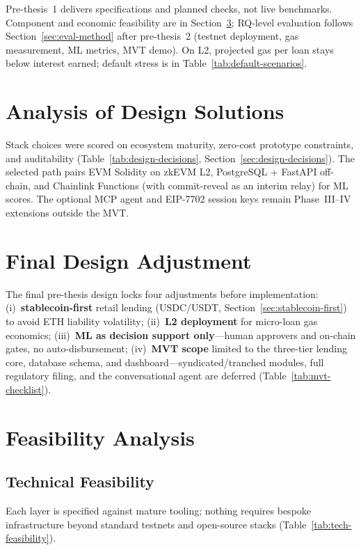 \documentclass[12pt, a4paper]{report}
\begin{document}
Pre-thesis~1 delivers specifications and planned checks, not live benchmarks. Component and economic feasibility are in Section~\ref{sec:feasibility}; RQ-level evaluation follows Section~\ref{sec:eval-method} after pre-thesis~2 (testnet deployment, gas measurement, ML metrics, MVT demo). On L2, projected gas per loan stays below interest earned; default stress is in Table~\ref{tab:default-scenarios}.

\section{Analysis of Design Solutions}
\label{sec:design-solutions-ch5}

Stack choices were scored on ecosystem maturity, zero-cost prototype constraints, and auditability (Table~\ref{tab:design-decisions}, Section~\ref{sec:design-decisions}). The selected path pairs EVM Solidity on zkEVM L2, PostgreSQL + FastAPI off-chain, and Chainlink Functions (with commit-reveal as an interim relay) for ML scores. The optional MCP agent and EIP-7702 session keys remain Phase~III--IV extensions outside the MVT.

\section{Final Design Adjustment}
\label{sec:final-design-adjustment}

The final pre-thesis design locks four adjustments before implementation: (i)~\textbf{stablecoin-first} retail lending (USDC/USDT, Section~\ref{sec:stablecoin-first}) to avoid ETH liability volatility; (ii)~\textbf{L2 deployment} for micro-loan gas economics; (iii)~\textbf{ML as decision support only}---human approvers and on-chain gates, no auto-disbursement; (iv)~\textbf{MVT scope} limited to the three-tier lending core, database schema, and dashboard---syndicated/tranched modules, full regulatory filing, and the conversational agent are deferred (Table~\ref{tab:mvt-checklist}).

\section{Feasibility Analysis}
\label{sec:feasibility}

\subsection{Technical Feasibility}

Each layer is specified against mature tooling; nothing requires bespoke infrastructure beyond standard testnets and open-source stacks (Table~\ref{tab:tech-feasibility}).
\end{document}
